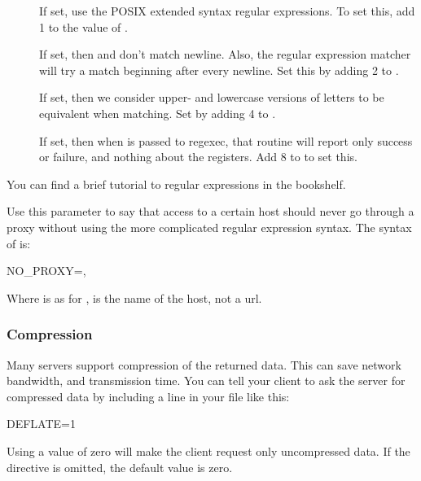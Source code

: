\begin{description}
  \begin{description}
  \item[] If set, use the POSIX extended syntax
    regular expressions.  To set this, add 1 to the value of .
  \item[] If set, then  and \lit{[\^{ }...]}
    don't match newline.  Also, the regular expression matcher will
    try a match beginning after every newline. Set this by adding 2 to
    .
  \item[] If set, then we consider upper- and
    lowercase versions of letters to be equivalent when matching. Set
    by adding 4 to .
  \item[] If set, then when  is passed to regexec, that
     routine will report only success or failure, and nothing about the
     registers. Add 8 to  to set this.
  \end{description}

  You can find a brief tutorial to regular expressions in the \opendap
  bookshelf.
  
\item[\lit{NO\_PROXY}] Use this parameter to say that access to a
  certain host should never go through a proxy without using the more
  complicated regular expression syntax. The syntax of 
  is:

  \begin{example}
NO_PROXY=,
  \end{example}
  
  Where  is as for , 
  is the name of the host, not a url.  

\subsubsection{Compression}

Many \opendap servers support compression of the returned data.  This can
save network bandwidth, and transmission time.  You can tell your
client to ask the server for compressed data by including a line in
your  file like this:

\begin{example}
DEFLATE=1
\end{example}

Using a value of zero will make the client request only uncompressed
data.  If the directive is omitted, the default value is zero.


\end{description}
